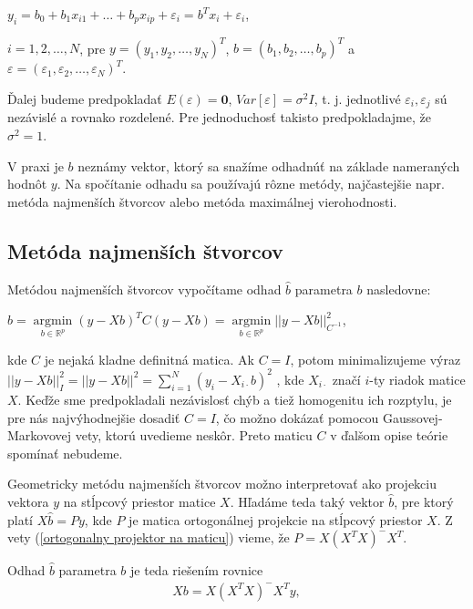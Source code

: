 \begin{center}
$
y_i = b_0 + b_1 x_{i1} + … + b_p x_{ip} + {\varepsilon}_i = b^T x_i + {\varepsilon}_i
$,
\end{center}

$i = 1, 2, \ldots, N$,
pre $y = (y_1, y_2, \ldots, y_N)^T$, $b = (b_1, b_2, \ldots, b_p)^T$ a $\varepsilon = ({\varepsilon}_1, {\varepsilon}_2, \ldots, {\varepsilon}_N)^T$.

Ďalej budeme predpokladať $E(\varepsilon) = \textbf{0}$, $Var[\varepsilon] = {\sigma}^2 I$,
t. j. jednotlivé ${\varepsilon}_i, {\varepsilon}_j$ sú nezávislé a rovnako rozdelené.
Pre jednoduchosť takisto predpokladajme, že ${\sigma}^2 = 1$.

V praxi je $b$ neznámy vektor, ktorý sa snažíme odhadnúť na základe nameraných hodnôt $y$.
Na spočítanie odhadu sa používajú rôzne metódy, najčastejšie napr. metóda najmenších štvorcov alebo metóda maximálnej vierohodnosti.

\subsection{Metóda najmenších štvorcov}

Metódou najmenších štvorcov vypočítame odhad $\hat{b}$ parametra $b$ nasledovne:

\begin{center}
$
\hat{b} = \underset{b \in \mathbb{R}^{p}}{\operatorname{arg min}} (y - Xb)^T C (y - Xb) =
\underset{b \in \mathbb{R}^{p}}{\operatorname{arg min}} ||y - Xb||_{C^{-1}}^2
$,
\end{center}

kde $C$ je nejaká kladne definitná matica. 
Ak $C = I$, potom minimalizujeme výraz
$||y - Xb||_I^2 = ||y - Xb||^2 = \sum_{i=1}^N (y_i - X_{i \cdot } b)^2$
, kde $X_{i \cdot }$ značí $i$-ty riadok matice $X$.
Keďže sme predpokladali nezávislosť chýb a tiež homogenitu ich rozptylu, je pre nás najvýhodnejšie dosadiť $C = I$,
čo možno dokázať pomocou Gaussovej-Markovovej vety, ktorú uvedieme neskôr.
Preto maticu $C$ v ďalšom opise teórie spomínať nebudeme.

Geometricky metódu najmenších štvorcov možno interpretovať ako projekciu vektora $y$ 
na stĺpcový priestor matice $X$. Hľadáme teda taký vektor $\hat{b}$, 
pre ktorý platí $X \hat{b} = Py$, kde $P$ je matica ortogonálnej projekcie na stĺpcový priestor $X$. 
Z vety (\ref{ortogonalny projektor na maticu}) vieme, že $P = X (X^T X)^- X^T$.

Odhad $\hat{b}$ parametra $b$ je teda riešením rovnice
\begin{align}
\label{least squares solution}
X b =  X (X^T X)^- X^T y,
\end{align}

